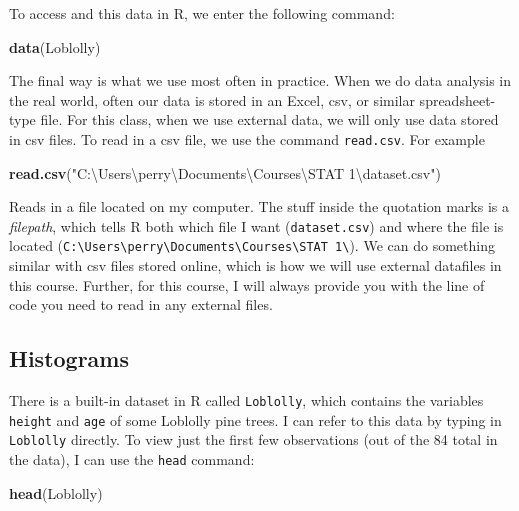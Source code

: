 \documentclass[
]{book}
\newenvironment{Shaded}{\begin{snugshade}}{\end{snugshade}}
\newcommand{\FunctionTok}[1]{\textcolor[rgb]{0.13,0.29,0.53}{\textbf{#1}}}
\newcommand{\NormalTok}[1]{#1}
\newcommand{\StringTok}[1]{\textcolor[rgb]{0.31,0.60,0.02}{#1}}
\begin{document}
To access and this data in R, we enter the following command:

\begin{Shaded}
\begin{Highlighting}[]
\FunctionTok{data}\NormalTok{(Loblolly)}
\end{Highlighting}
\end{Shaded}

The final way is what we use most often in practice. When we do data analysis in the real world, often our data is stored in an Excel, csv, or similar spreadsheet-type file. For this class, when we use external data, we will only use data stored in csv files. To read in a csv file, we use the command \texttt{read.csv}. For example

\begin{Shaded}
\begin{Highlighting}[]
\FunctionTok{read.csv}\NormalTok{(}\StringTok{"C:\textbackslash{}Users\textbackslash{}perry\textbackslash{}Documents\textbackslash{}Courses\textbackslash{}STAT 1\textbackslash{}dataset.csv"}\NormalTok{)}
\end{Highlighting}
\end{Shaded}

Reads in a file located on my computer. The stuff inside the quotation marks is a \emph{filepath}, which tells R both which file I want (\texttt{dataset.csv}) and where the file is located (\texttt{C:\textbackslash{}Users\textbackslash{}perry\textbackslash{}Documents\textbackslash{}Courses\textbackslash{}STAT\ 1\textbackslash{}}). We can do something similar with csv files stored online, which is how we will use external datafiles in this course. Further, for this course, I will always provide you with the line of code you need to read in any external files.

\subsection*{Histograms}\label{histograms}

There is a built-in dataset in R called \texttt{Loblolly}, which contains the variables \texttt{height} and \texttt{age} of some Loblolly pine trees. I can refer to this data by typing in \texttt{Loblolly} directly. To view just the first few observations (out of the 84 total in the data), I can use the \texttt{head} command:

\begin{Shaded}
\begin{Highlighting}[]
\FunctionTok{head}\NormalTok{(Loblolly)}
\end{Highlighting}
\end{Shaded}
\end{document}
